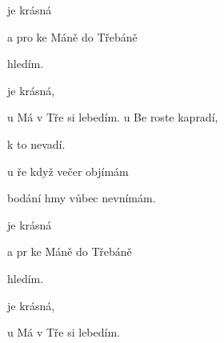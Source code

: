 
\zr
{}  je krásná

a pro ke  Máně do Třebáně 

  hledím. 

  je krásná, 

u Má v Tře si  lebedím. 
\kr
\zs
{} u Be roste kapradí, 

  k to  nevadí. 

 u ře když večer objímám 

 bodání hmy vůbec nevnímám. 
\ks

\zr
{}  je krásná 

a pr ke  Máně do Třebáně 

  hledím. 

  je krásná, 

u Má v Tře si  lebedím.
\kr
\kp


